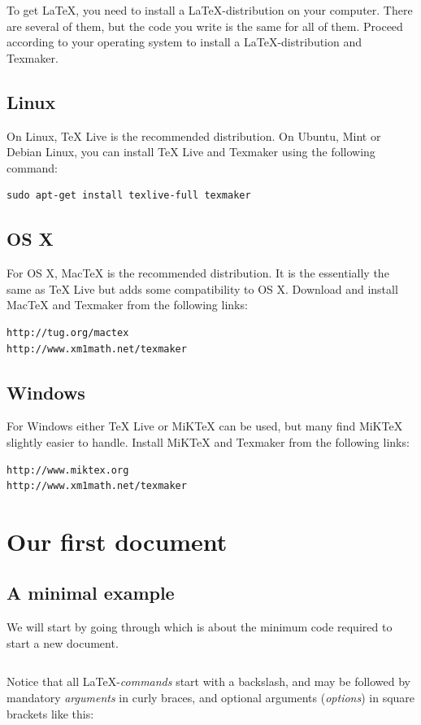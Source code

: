 To get \LaTeX{}, you need to install a \LaTeX{}-distribution on your computer. There are several of them, but the code you write is the same for all of them. Proceed according to your operating system to install a \LaTeX-distribution and Texmaker.

\subsection{Linux}
On Linux, TeX Live is the recommended distribution. On Ubuntu, Mint or Debian Linux, you can install TeX Live and Texmaker using the following command:
\begin{verbatim}
sudo apt-get install texlive-full texmaker
\end{verbatim}

\subsection{OS X}
For OS X, MacTeX is the recommended distribution. It is the essentially the same as TeX Live but adds some compatibility to OS X. Download and install MacTeX and Texmaker from the following links:

\begin{verbatim}
http://tug.org/mactex
http://www.xm1math.net/texmaker
\end{verbatim}

\subsection{Windows}
For Windows either TeX Live or MiKTeX can be used, but many find MiKTeX slightly easier to handle. Install MiKTeX and Texmaker from the following links:

\begin{verbatim}
http://www.miktex.org
http://www.xm1math.net/texmaker
\end{verbatim}

\section{Our first document}

\subsection{A minimal example}
We will start by going through  which is about the minimum code required to start a new document.
\begin{listing}
	\inputminted{latex}{latex/first.tex}
	\caption{A (near-)minimal \LaTeX{} document}
	\label{lst:latex:minimal}
\end{listing}
Notice that all \LaTeX{}-\emph{commands} start with a backslash, and may be followed by mandatory \emph{arguments} in curly braces, and optional arguments (\emph{options}) in square brackets like this:

